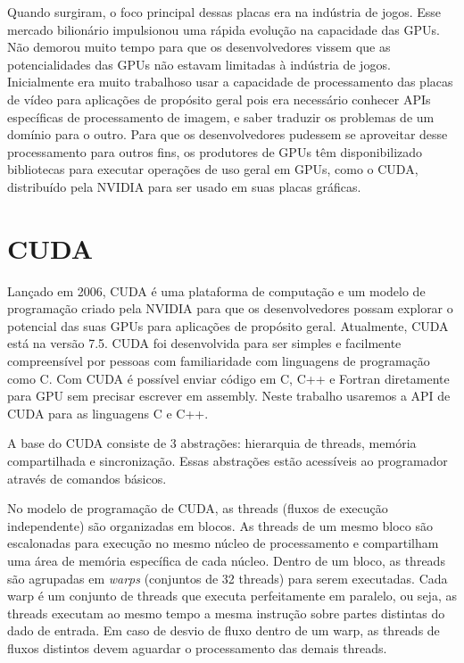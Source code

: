 Quando surgiram, o foco principal dessas placas era na indústria de jogos. Esse mercado bilionário impulsionou uma rápida evolução na capacidade das GPUs. Não demorou muito tempo para que os desenvolvedores vissem que as potencialidades das GPUs não estavam  limitadas à indústria de jogos. Inicialmente era muito trabalhoso usar a capacidade de processamento das placas de vídeo para aplicações de propósito geral pois era necessário conhecer APIs específicas de processamento de imagem, e saber traduzir os problemas de um domínio para o outro. Para que os desenvolvedores pudessem se aproveitar desse processamento para outros fins, os produtores de GPUs têm disponibilizado bibliotecas para executar operações de uso geral em GPUs, como o CUDA, distribuído pela NVIDIA para ser usado em suas placas gráficas.

\section{CUDA}
Lançado em 2006, CUDA \cite{CUDA} é uma plataforma de computação e um modelo de programação criado pela NVIDIA para que os desenvolvedores possam explorar o potencial das suas GPUs para aplicações de propósito geral. Atualmente, CUDA está na versão 7.5. CUDA foi desenvolvida para ser simples e facilmente compreensível por pessoas com familiaridade com linguagens de programação como C. Com CUDA é possível enviar código em C, C++ e Fortran diretamente para GPU sem precisar escrever em assembly.
Neste trabalho usaremos a API de CUDA para as linguagens C e C++.

A base do CUDA consiste de 3 abstrações: hierarquia de threads, memória compartilhada e sincronização. Essas abstrações estão acessíveis ao programador através de comandos básicos. 

No modelo de programação de CUDA, as threads (fluxos de execução independente) são organizadas em blocos.
As threads de um mesmo bloco são escalonadas para execução no mesmo núcleo de processamento e compartilham uma área de memória específica de cada núcleo. Dentro de um bloco, as threads são agrupadas em {\em warps} (conjuntos de 32 threads) para serem executadas. Cada warp é um conjunto de threads que executa perfeitamente em paralelo, ou seja, as threads executam ao mesmo tempo a mesma instrução sobre partes distintas do dado de entrada. Em caso de desvio de fluxo dentro de um warp, as threads de fluxos distintos devem aguardar o processamento das demais threads. 


